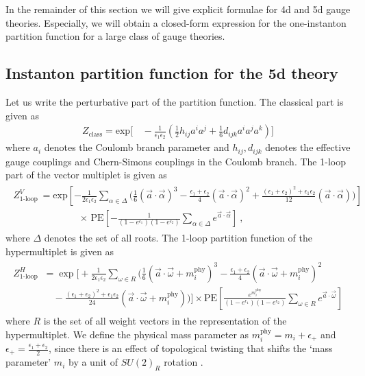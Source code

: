\documentclass[letterpaper, 11pt]{article}
\def\e{\epsilon}
\begin{document}
In the remainder of this section we will give explicit formulae for 4d and 5d gauge theories. Especially, we will obtain a closed-form expression for the one-instanton partition function for a large class of gauge theories. 

\subsection{Instanton partition function for the 5d theory}
Let us write the perturbative part of the partition function. The classical part is given as
\begin{align}
Z_{\textrm{class}}=\textrm{exp}\Bigg[&\,-\frac{1}{\epsilon_1\epsilon_2}\left(\frac{1}{2}h_{ij} a^i a^j+\frac{1}{6}d_{ijk} a^{i}a^j a^k\right)\Bigg]
\end{align}
where $a_i$ denotes the Coulomb branch parameter and $h_{ij}, d_{ijk}$ denotes the effective gauge couplings and Chern-Simons couplings in the Coulomb branch. 
The 1-loop part of the vector multiplet is given as
\begin{align} \label{eq:1loopvec}
\begin{split}
Z^{V}_{\textrm{1-loop}}&=\textrm{exp}\left[ -\frac{1}{2\epsilon_1\epsilon_2} \sum_{\alpha\in\Delta}\Bigg(\frac{1}{6}(\vec{a}\cdot\vec{\alpha})^3-\frac{\epsilon_1+\epsilon_2}{4}(\vec{a}\cdot\vec{\alpha})^2+\frac{(\epsilon_1+\epsilon_2)^2+\epsilon_1\epsilon_2}{12}(\vec{a}\cdot\vec{\alpha})\Bigg) \right] \\
&\qquad \qquad \times\,\textrm{PE}\left[- \frac{1}{(1-e^{\e_1})(1-e^{\e_2})}\sum_{\alpha\in \Delta}e^{\vec{a}\cdot\vec{\alpha}}\right] \ , 
\end{split}
\end{align}
where $\Delta$ denotes the set of all roots. The 1-loop partition function of the hypermultiplet is given as
\begin{align} \label{eq:1loophyp}
\begin{split}
Z^{H}_{\textrm{1-loop}} &= \exp \Bigg[+\frac{1}{2\epsilon_1\epsilon_2} \sum_{\omega\in R }\Bigg(\frac{1}{6}\left(\vec{a}\cdot\vec{\omega}+m^{\textrm{phy}}_i \right)^3-\frac{\e_1+\e_2}{4}\left(\vec{a}\cdot\vec{\omega}+m^{\textrm{phy}}_i \right)^2 \\
 &\quad -\frac{(\epsilon_1+\epsilon_2)^2+\epsilon_1\epsilon_2}{24}\left(\vec{a}\cdot\vec{\omega}+m^{\textrm{phy}}_i \right)\Bigg)\Bigg] \times 
\textrm{PE} \left[ \frac{e^{m^{\textrm{phy}}_i}}{(1-e^{\e_1})(1-e^{\e_2})} \sum_{\omega\in R}e^{\vec{a}\cdot\vec{\omega}} \right]
\end{split}
\end{align}
where $R$ is the set of all weight vectors in the representation of the hypermultiplet. We define the physical mass parameter as $m^{\textrm{phy}}_i = m_i + \e_+$ and $\e_+ = \frac{\e_1+\e_2}{2}$, since there is an effect of topological twisting that shifts the `mass parameter' $m_i$ by a unit of $SU(2)_R$ rotation \cite{Okuda:2010ke}. 
\end{document}
